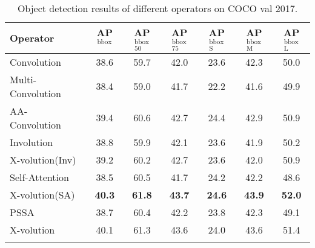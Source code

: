 \documentclass{article}
\newcommand{\cgap}[2]{
	\fontsize{6pt}{1em}\selectfont{(${#1}${#2})}
}
\newcommand{\apbbox}[1]{AP$^\text{bbox}_\text{#1}$}
\begin{document}
\begin{table*}[t]\centering
 \caption{Object detection results of different operators on COCO val 2017.}
 \label{tab_det}
 \begin{spacing}{1.2}
 \small
\setlength\tabcolsep{6.4pt}
 \begin{threeparttable}
 \begin{tabular}{l|c|c|c|c|c|c}
        \Xhline{1.1pt}
        Operator
		& \fontsize{8pt}{1em}\selectfont \quad\apbbox{~}
		& \fontsize{8pt}{1em}\selectfont \quad\apbbox{50}
		& \fontsize{8pt}{1em}\selectfont \quad\apbbox{75}
		& \fontsize{8pt}{1em}\selectfont \quad\apbbox{S}
		& \fontsize{8pt}{1em}\selectfont \quad\apbbox{M}
		& \fontsize{8pt}{1em}\selectfont \quad\apbbox{L} \\ \hline

		Convolution & 38.6 & 59.7 & 42.0 & 23.6 & 42.3 & 50.0 \\ 
		Multi-Convolution & 38.4\cgap{-}{0.2}  & 59.0\cgap{-}{0.7}  & 41.7\cgap{-}{0.3}  & 22.2\cgap{-}{1.4} & 41.6\cgap{-}{0.7} &  49.9\cgap{-}{0.1} \\
		AA-Convolution~\cite{DBLP:conf/iccv/BelloZLVS19}
		& 39.4\cgap{+}{0.8}  & 60.6\cgap{+}{0.9}  & 42.7\cgap{+}{0.7}  & 24.4\cgap{+}{0.8} &  42.9\cgap{+}{0.6} &  50.9\cgap{+}{0.9} \\ 
	
		\cline{1-7}
		
		Involution~\cite{DBLP:journals/corr/abs-2103-06255}
		& 38.8\cgap{+}{0.2} & 59.9\cgap{+}{0.2} & 42.1\cgap{+}{0.1} & 23.6\cgap{+}{0.0} & 41.9\cgap{-}{0.4} & 50.2\cgap{+}{0.2} \\ 
		X-volution(Inv) & 39.2\cgap{+}{0.6} & 60.2\cgap{+}{0.5} & 42.7\cgap{+}{0.7} & 23.6\cgap{+}{0.0} & 42.0\cgap{-}{0.3} & 
		50.9\cgap{+}{0.9}\\ \cline{1-7}
		
		Self-Attention~\cite{DBLP:conf/nips/VaswaniSPUJGKP17}
		&  38.5\cgap{-}{0.1} & 60.5\cgap{+}{0.8}  & 41.7\cgap{-}{0.3}  & 24.2\cgap{+}{0.6}  &  42.2\cgap{-}{0.1} & 48.6\cgap{-}{1.4}  \\ 
		X-volution(SA)& \textbf{40.3}\cgap{+}{1.7} & \textbf{61.8}\cgap{+}{2.1} & \textbf{43.7}\cgap{+}{1.7} & \textbf{24.6}\cgap{+}{1.0} & \textbf{43.9}\cgap{+}{1.6} & \textbf{52.0}\cgap{+}{2.0} \\
		\cline{1-7}
		
		PSSA & 38.7\cgap{+}{0.1} & 60.4\cgap{+}{0.7} & 42.2\cgap{+}{0.2} & 23.8\cgap{+}{0.2} & 42.3\cgap{+}{0.0} & 49.1\cgap{-}{0.9} \\ 
		X-volution & 40.1\cgap{+}{1.5} & 61.3\cgap{+}{1.6} & 43.6\cgap{+}{1.6} & 24.0\cgap{+}{0.4} & 43.6\cgap{+}{1.3} & 51.4\cgap{+}{1.4} \\
		\Xhline{1.0pt}
		

\end{tabular}
\end{threeparttable}
\end{spacing}
\end{table*}
\end{document}
